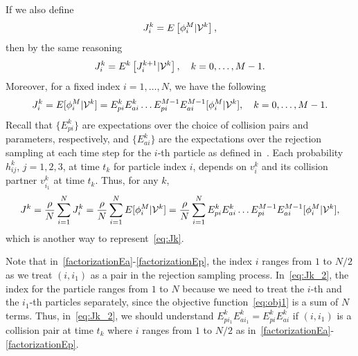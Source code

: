 \documentclass[12pt,nopreprintline]{elsarticle}
\begin{document}
If we also define 
\begin{equation}\label{eq:Jki}
   J_i^k = E\left[ \phi_i^M | {\cal V}^k\right] ,
\end{equation}
then by the same reasoning
\begin{equation*}%
J^k_i = E^k\left[ J^{k+1}_i | {\cal V}^k \right],\quad k =0,\ldots, M-1.
\end{equation*}
Moreover, for a fixed index $i=1,\ldots,N$, we have the following
\begin{equation*}
 J_i^k  = E[\phi_i^M | \mathcal V^k] = E_{pi}^k E_{ai}^k \ldots E_{pi}^{M-1} E_{ai}^{M-1} [\phi_i^M | \mathcal V^k], \quad k =0,\ldots, M-1.
\end{equation*}
Recall that $\{E_{pi}^k\}$ are expectations over the choice of collision pairs and parameters, respectively, and $\{E_{ai}^k\}$ are the expectations over the rejection sampling at each time step for the $i$-th particle as defined in~. Each probability $h_{ij}^k$, $j=1,2,3$, at time $t_k$ for particle index $i$, depends on $v_i^k$ and its collision partner $v_{i_1}^k$ at time $t_k$. Thus, for any $k$, 
\begin{equation} \label{eq:Jk_2}
 J^k  = \frac{\rho}{N}\sum_{i=1}^N J^k_i = \frac{\rho}{N} \sum_{i=1}^N  E[\phi_i^M | \mathcal V^k] = \frac{\rho}{N} \sum_{i=1}^N  E_{pi}^k E_{ai}^k \ldots E_{pi}^{M-1} E_{ai}^{M-1} [\phi_i^M | \mathcal V^k],
\end{equation}
which is another way to represent~\eqref{eq:Jk}.

Note that in~\eqref{factorizationEa}-\eqref{factorizationEp}, the index $i$ ranges from $1$ to $N/2$ as we treat $(i,i_1)$ as a pair in the rejection sampling process. In~\eqref{eq:Jk_2}, the index for the particle ranges from $1$ to $N$ because we need to treat the $i$-th and the $i_1$-th particles separately, since the objective function~\eqref{eq:obj1} is a sum of $N$ terms. Thus, in~\eqref{eq:Jk_2}, we should understand $E_{pi_1}^k E_{ai_1}^k = E_{pi}^k E_{ai}^k$ if $(i,i_1)$ is a collision pair at time $t_k$ where $i$ ranges from $1$ to $N/2$ as in~\eqref{factorizationEa}-\eqref{factorizationEp}.
\end{document}
